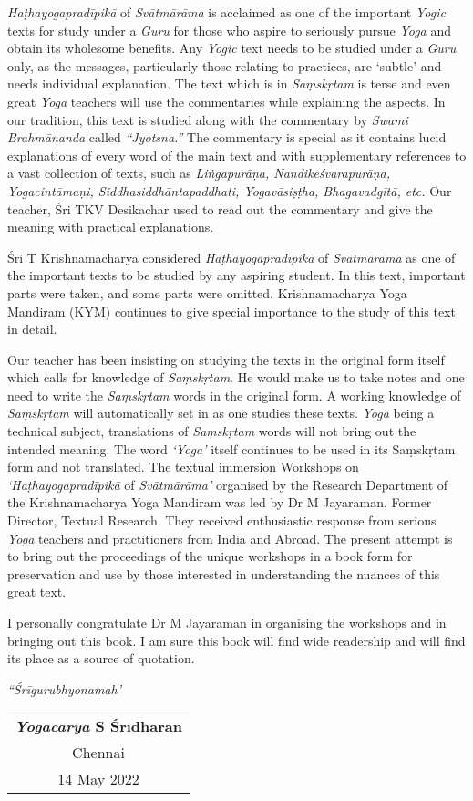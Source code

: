 \textit{Haṭhayogapradīpikā} of \textit{Svātmārāma} is acclaimed as one of the important \textit{Yogic} texts for study under a \textit{Guru} for those who aspire to seriously pursue \textit{Yoga} and obtain its wholesome benefits. Any \textit{Yogic} text needs to be studied under a \textit{Guru} only, as the messages, particularly those relating to practices, are ‘subtle’ and needs individual explanation. The text which is in \textit{Saṃskṛtam} is terse and even great \textit{Yoga} teachers will use the commentaries while explaining the aspects. In our tradition, this text is studied along with the commentary by \textit{Swami Brahmānanda} called \textit{“Jyotsna.”} The commentary is special as it contains lucid explanations of every word of the main text and with supplementary references to a vast collection of texts, such as \textit{Liṅgapurāṇa, Nandikeśvarapurāṇa, Yogacintāmaṇi, Siddhasiddhāntapaddhati, 
Yogavāsiṣṭha, Bhagavadgītā, etc.} Our teacher, Śri TKV Desikachar used to read out the commentary and give the meaning with practical explanations.

Śri T Krishnamacharya considered \textit{Haṭhayogapradīpikā} of \textit{Svātmārāma} as one of the important texts to be studied by any aspiring student.  In this text, important parts were taken, and some parts were omitted. Krishnamacharya Yoga Mandiram (KYM) continues to give special importance to the study of this text in detail.

Our teacher has been insisting on studying the texts in the original form itself which calls for knowledge of \textit{Saṃskṛtam}.  He would make us to take notes and one need to write the \textit{Saṃskṛtam} words in the original form.  A working knowledge of \textit{Saṃskṛtam} will automatically set in as one studies these texts. \textit{Yoga} being a technical subject, translations of \textit{Saṃskṛtam} words will not bring out the intended meaning. The word \textit{‘Yoga’} itself continues to be used in its Saṃskṛtam form and not translated.
\newpage
The textual immersion Workshops on \textit{‘Haṭhayogapradīpikā} of \textit{Svātmā\-rāma’} organised by the Research Department of the Krishnamacharya Yoga Mandiram was led by Dr M Jayaraman, Former Director, Textual Research. They received enthusiastic response from serious \textit{Yoga} teachers and practitioners from India and Abroad. The present attempt is to bring out the proceedings of the unique workshops in a book form for preservation and use by those interested in understanding the nuances of this great text.

I personally congratulate Dr M Jayaraman in organising the workshops and in bringing out this book.  I am sure this book will find wide readership and will find its place as a source of quotation.
\bigskip

\centerline{\textit{“Śrīgurubhyonamah’}}
\bigskip

\begin{flushright} 
\begin{tabular}{c}
\textbf{\textit{Yogācārya} S Śrīdharan}\\
Chennai\\
14 May 2022
\end{tabular}
\end{flushright}
